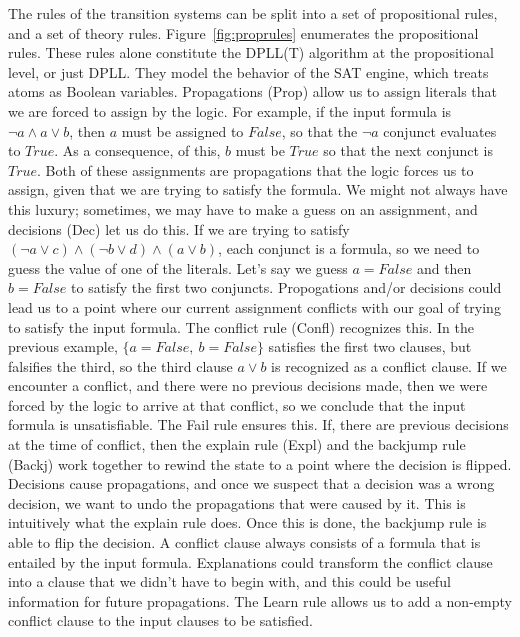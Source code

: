 \documentclass{article}
\begin{document}
The rules of the transition systems can be split into a 
set of propositional rules, and a set of theory rules. 
Figure~\ref{fig:proprules} enumerates the propositional rules.
These rules alone constitute the DPLL(T) algorithm at the
propositional level, or just DPLL.
They model the behavior of the SAT engine, 
which treats atoms
as Boolean variables. Propagations (Prop) allow us to assign 
literals that we are forced to assign by the logic. 
For example, if the input formula is $\neg a \land a \lor b$, 
then $a$ must be assigned to $False$, so that the $\neg a$ 
conjunct evaluates to $True$. As a consequence, of this, 
$b$ must be $True$ so that the next conjunct is $True$. Both 
of these assignments are propagations that the logic forces 
us to assign, given that we are trying to satisfy the formula.
We might not always have this luxury; sometimes, we may have 
to make a guess on an assignment, and decisions (Dec) let us do 
this. If we are trying to satisfy 
$(\neg a \lor c) \land (\neg b \lor d) \land (a \lor b)$,
each conjunct is a 
formula, so we need to guess the value of one of the literals. 
Let's say we guess $a = False$ and then $b = False$ 
to satisfy the first two conjuncts.
Propogations and/or decisions could lead us to 
a point where our current assignment conflicts with 
our goal of trying to satisfy the input formula. The 
conflict rule (Confl) recognizes this. In the previous 
example, $\{a = False,\ b = False\}$ satisfies the first two
clauses, but falsifies the third, so the third clause 
$a \lor b$ is recognized as a conflict clause.
If we encounter a conflict, 
and there were no previous decisions made, then we were 
forced by the logic to arrive at that conflict, so we 
conclude that the input formula is unsatisfiable. The Fail 
rule ensures this. If, there are previous decisions at
the time of conflict, then the explain rule (Expl) 
and the backjump rule (Backj) work together to rewind 
the state to a point where the decision is flipped. 
Decisions cause propagations, and once we suspect that 
a decision was a wrong decision, we want to undo the 
propagations that were caused by it. This is intuitively 
what the explain rule does. Once this is done, the backjump rule is able to flip the decision. A conflict clause always 
consists of a formula that is entailed by the input formula. 
Explanations could transform the conflict 
clause into a clause that we didn't have to begin with, 
and this could be useful information for future propagations. 
The Learn rule allows us 
to add a non-empty conflict clause to the input clauses to be 
satisfied. 
\end{document}
